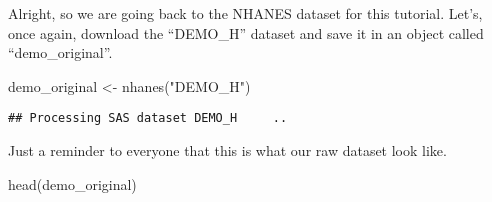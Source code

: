 \documentclass[
]{book}
\newenvironment{Shaded}{\begin{snugshade}}{\end{snugshade}}
\newcommand{\FunctionTok}[1]{\textcolor[rgb]{0.00,0.00,0.00}{#1}}
\newcommand{\NormalTok}[1]{#1}
\newcommand{\OtherTok}[1]{\textcolor[rgb]{0.56,0.35,0.01}{#1}}
\newcommand{\StringTok}[1]{\textcolor[rgb]{0.31,0.60,0.02}{#1}}
\begin{document}
Alright, so we are going back to the NHANES dataset for this tutorial. Let's, once again, download the ``DEMO\_H'' dataset and save it in an object called ``demo\_original''.

\begin{Shaded}
\begin{Highlighting}[]
\NormalTok{demo\_original }\OtherTok{\textless{}{-}} \FunctionTok{nhanes}\NormalTok{(}\StringTok{"DEMO\_H"}\NormalTok{)}
\end{Highlighting}
\end{Shaded}

\begin{verbatim}
## Processing SAS dataset DEMO_H     ..
\end{verbatim}

Just a reminder to everyone that this is what our raw dataset look like.

\begin{Shaded}
\begin{Highlighting}[]
\FunctionTok{head}\NormalTok{(demo\_original)}
\end{Highlighting}
\end{Shaded}
\end{document}

